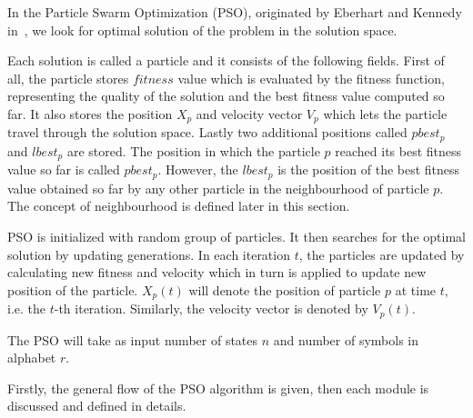 \documentclass{mini}
\begin{document}
In the Particle Swarm Optimization (PSO), originated by Eberhart and Kennedy in~\cite{pso_origin}, we look for optimal solution of the problem in the solution space. 

Each solution is called a particle and it consists of the following fields. First of all, the particle stores $fitness$ value which is evaluated by the fitness function, representing the quality of the solution and the best fitness value computed so far. It also stores the position $X_p$ and velocity vector $V_p$ which lets the particle travel through the solution space. Lastly two additional positions called $pbest_p$ and $lbest_p$ are stored. The position in which the particle $p$ reached its best fitness value so far is called $pbest_p$. However, the $lbest_p$ is the position of the best fitness value obtained so far by any other particle in the neighbourhood of particle $p$. The concept of neighbourhood is defined later in this section.

PSO is initialized with random group of particles. It then searches for the optimal solution by updating generations.
In each iteration $t$, the particles are updated by calculating new fitness and velocity which in turn is applied to update new position of the particle. $X_p(t)$ will denote the position of particle $p$ at time $t$, i.e. the $t$-th iteration. Similarly, the velocity vector is denoted by $V_p(t)$.

The PSO will take as input number of states $n$ and number of symbols in alphabet $r$.

Firstly, the general flow of the PSO algorithm is given, then each module is discussed and defined in details.
\end{document}
